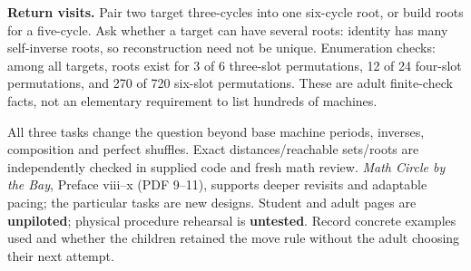 \textbf{Return visits.} Pair two target three-cycles into one six-cycle root, or build roots for a five-cycle. Ask whether a target can have several roots: identity has many self-inverse roots, so reconstruction need not be unique. Enumeration checks: among all targets, roots exist for 3 of 6 three-slot permutations, 12 of 24 four-slot permutations, and 270 of 720 six-slot permutations. These are adult finite-check facts, not an elementary requirement to list hundreds of machines.

All three tasks change the question beyond base machine periods, inverses, composition and perfect shuffles. Exact distances/reachable sets/roots are independently checked in supplied code and fresh math review. \emph{Math Circle by the Bay}, Preface viii--x (PDF 9--11), supports deeper revisits and adaptable pacing; the particular tasks are new designs. Student and adult pages are \textbf{unpiloted}; physical procedure rehearsal is \textbf{untested}. Record concrete examples used and whether the children retained the move rule without the adult choosing their next attempt.
